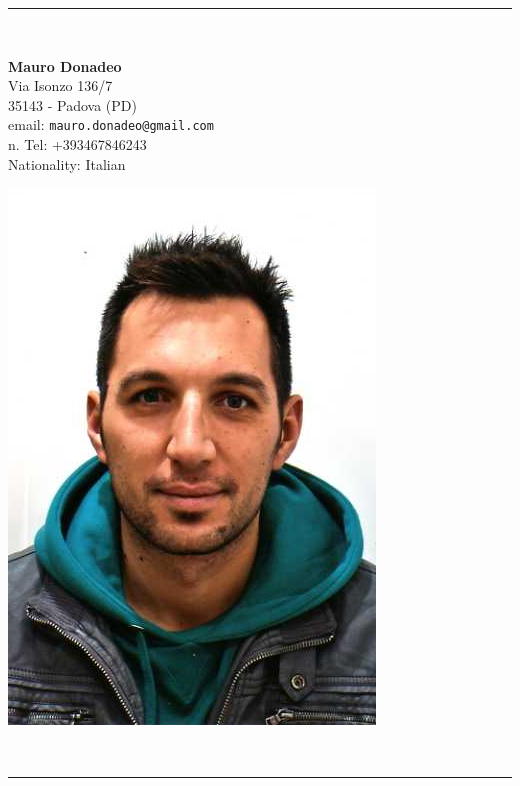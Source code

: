 \documentclass[pdftex,a4paper,12pt,twoside,titlepage,italian,openright]{article}
\begin{document}
\vspace*{.2cm}
\begin{center}
\rule{.8 \textwidth}{1pt}\\[5pt]
\begin{minipage}{.55\textwidth}
	\LARGE\textbf{Mauro Donadeo}\\[20pt]
	\footnotesize Via Isonzo 136/7 \\ 
	35143 - Padova (PD)\\
	email: \texttt{mauro.donadeo@gmail.com}\\
	\footnotesize n. Tel: +393467846243\\
	\footnotesize Nationality: Italian\\
\end{minipage}
\begin{minipage}{.25\textwidth}
	\includegraphics[width=\textwidth]{io.jpg}
\end{minipage}\\[5pt]
\rule{.8 \textwidth}{1pt}
\end{center}
\end{document}
